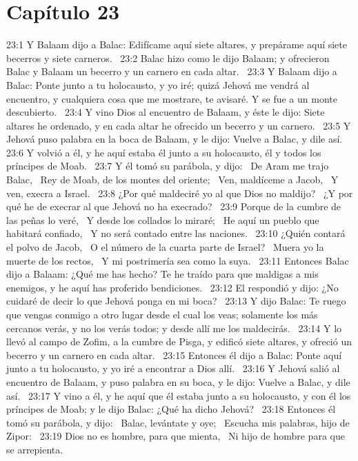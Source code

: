 \section*{Capítulo 23 }

23:1 Y Balaam dijo a Balac: Edifícame aquí siete altares, y prepárame aquí siete becerros y siete carneros.  
23:2 Balac hizo como le dijo Balaam; y ofrecieron Balac y Balaam un becerro y un carnero en cada altar.  
23:3 Y Balaam dijo a Balac: Ponte junto a tu holocausto, y yo iré; quizá Jehová me vendrá al encuentro, y cualquiera cosa que me mostrare, te avisaré. Y se fue a un monte descubierto.  
23:4 Y vino Dios al encuentro de Balaam, y éste le dijo: Siete altares he ordenado, y en cada altar he ofrecido un becerro y un carnero.  
23:5 Y Jehová puso palabra en la boca de Balaam, y le dijo: Vuelve a Balac, y dile así.  
23:6 Y volvió a él, y he aquí estaba él junto a su holocausto, él y todos los príncipes de Moab.  
23:7 Y él tomó su parábola, y dijo:  
De Aram me trajo Balac,  
Rey de Moab, de los montes del oriente;  
Ven, maldíceme a Jacob,  
Y ven, execra a Israel.  
23:8 ¿Por qué maldeciré yo al que Dios no maldijo?  
¿Y por qué he de execrar al que Jehová no ha execrado?  
23:9 Porque de la cumbre de las peñas lo veré,  
Y desde los collados lo miraré;  
He aquí un pueblo que habitará confiado,  
Y no será contado entre las naciones.  
23:10 ¿Quién contará el polvo de Jacob,  
O el número de la cuarta parte de Israel?  
Muera yo la muerte de los rectos,  
Y mi postrimería sea como la suya.  
23:11 Entonces Balac dijo a Balaam: ¿Qué me has hecho? Te he traído para que maldigas a mis enemigos, y he aquí has proferido bendiciones.  
23:12 El respondió y dijo: ¿No cuidaré de decir lo que Jehová ponga en mi boca?  
23:13 Y dijo Balac: Te ruego que vengas conmigo a otro lugar desde el cual los veas; solamente los más cercanos verás, y no los verás todos; y desde allí me los maldecirás.  
23:14 Y lo llevó al campo de Zofim, a la cumbre de Pisga, y edificó siete altares, y ofreció un becerro y un carnero en cada altar.  
23:15 Entonces él dijo a Balac: Ponte aquí junto a tu holocausto, y yo iré a encontrar a Dios allí.  
23:16 Y Jehová salió al encuentro de Balaam, y puso palabra en su boca, y le dijo: Vuelve a Balac, y dile así.  
23:17 Y vino a él, y he aquí que él estaba junto a su holocausto, y con él los príncipes de Moab; y le dijo Balac: ¿Qué ha dicho Jehová?  
23:18 Entonces él tomó su parábola, y dijo:  
Balac, levántate y oye;  
Escucha mis palabras, hijo de Zipor:  
23:19 Dios no es hombre, para que mienta,  
Ni hijo de hombre para que se arrepienta.  
